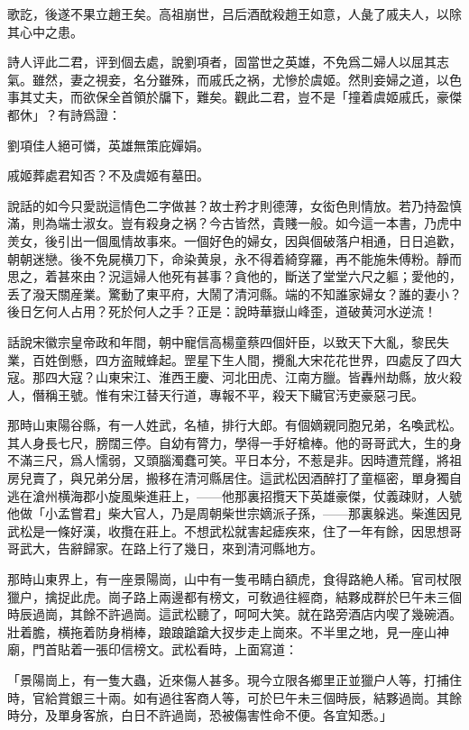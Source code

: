 歌訖，後遂不果立趙王矣。高祖崩世，吕后酒酖殺趙王如意，人彘了戚夫人，以除其心中之患。

詩人评此二君，评到個去處，說劉項者，固當世之英雄，不免爲二婦人以屈其志氣。雖然，妻之視妾，名分雖殊，而戚氏之祸，尤慘於虞姬。然則妾婦之道，以色事其丈夫，而欲保全首領於牖下，難矣。觀此二君，豈不是「撞着虞姬戚氏，豪傑都休」？有詩爲證：

\begin{myquote}
劉項佳人絕可憐，英雄無策庇嬋娟。

戚姬葬處君知否？不及虞姬有墓田。
\end{myquote}

說話的如今只愛説這情色二字做甚？故士矜才則德薄，女衒色則情放。若乃持盈慎滿，則為端士淑女。豈有殺身之祸？今古皆然，貴賤一般。如今這一本書，乃虎中羙女，後引出一個風情故事來。一個好色的婦女，因與個破落户相通，日日追歡，朝朝迷戀。後不免屍横刀下，命染黄泉，永不得着綺穿羅，再不能施朱傅粉。靜而思之，着甚來由？況這婦人他死有甚事？貪他的，斷送了堂堂六尺之軀；愛他的，丢了潑天關産業。驚動了東平府，大鬧了清河縣。端的不知誰家婦女？誰的妻小？後日乞何人占用？死於何人之手？正是：說時華嶽山峰歪，道破黄河水逆流！

話說宋徽宗皇帝政和年間，朝中寵信高楊童蔡四個奸臣，以致天下大亂，黎民失業，百姓倒懸，四方盗賊蜂起。罡星下生人間，攪亂大宋花花世界，四處反了四大寇。那四大寇？山東宋江、淮西王慶、河北田虎、江南方臘。皆轟州劫縣，放火殺人，僭稱王號。惟有宋江替天行道，專報不平，殺天下贜官汚吏豪惡刁民。

那時山東陽谷縣，有一人姓武，名植，排行大郎。有個嫡親同胞兄弟，名喚武松。其人身長七尺，膀闊三停。自幼有膂力，學得一手好槍棒。他的哥哥武大，生的身不滿三尺，爲人懦弱，又頭腦濁蠢可笑。平日本分，不惹是非。因時遭荒饉，將祖房兒賣了，與兄弟分居，搬移在清河縣居住。這武松因酒醉打了童樞密，單身獨自逃在滄州横海郡小旋風柴進莊上，——他那裏招攬天下英雄豪傑，仗義疎财，人號他做「小孟嘗君」柴大官人，乃是周朝柴世宗嫡派子孫，——那裏躲逃。柴進因見武松是一條好漢，收攬在莊上。不想武松就害起瘧疾來，住了一年有餘，因思想哥哥武大，告辭歸家。在路上行了幾日，來到清河縣地方。

那時山東界上，有一座景陽崗，山中有一隻弔睛白額虎，食得路絶人稀。官司杖限獵户，擒捉此虎。崗子路上兩邊都有榜文，可敎過往經商，結夥成群於巳午未三個時辰過崗，其餘不許過崗。這武松聽了，呵呵大笑。就在路旁酒店内喫了幾碗酒。壯着膽，横拖着防身梢棒，踉踉蹌蹌大扠步走上崗來。不半里之地，見一座山神廟，門首貼着一張印信榜文。武松看時，上面寫道：

\begin{myquote}
「景陽崗上，有一隻大蟲，近來傷人甚多。現今立限各鄉里正並獵户人等，打捕住時，官給賞銀三十兩。如有過往客商人等，可於巳午未三個時辰，結夥過崗。其餘時分，及單身客旅，白日不許過崗，恐被傷害性命不便。各宜知悉。」
\end{myquote}

